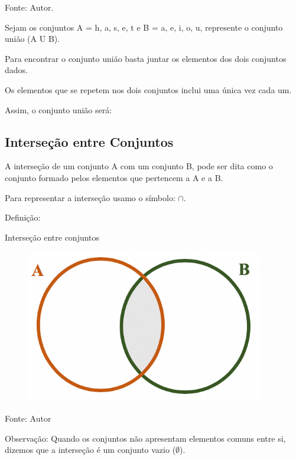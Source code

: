 \begin{multicols*}{2}
	Fonte: Autor.

	Sejam os conjuntos A = {h, a, s, e, t} e B = {a, e, i, o, u}, represente o conjunto união (A U B).

	Para encontrar o conjunto união basta juntar os elementos dos dois conjuntos dados.

	Os elementos que se repetem nos dois conjuntos inclui uma única vez cada um.

	Assim, o conjunto união será:


	\subsection{Interseção entre Conjuntos}

	A interseção de um conjunto A com um conjunto B, pode ser dita como o conjunto formado pelos elementos que pertencem a A e a B.

	Para representar a interseção usamo o símbolo: $ \cap $.

	Definição:


	Interseção entre conjuntos\\

	\begin{figure}[H]
		\centering
		\includegraphics[width=\columnwidth]{assets/Conjunto Intersecção.png}
	\end{figure}

	Fonte: Autor

	Observação: Quando os conjuntos não apresentam elementos comuns entre si, dizemos que a interseção é um conjunto vazio ($\emptyset$).


\end{multicols*}
